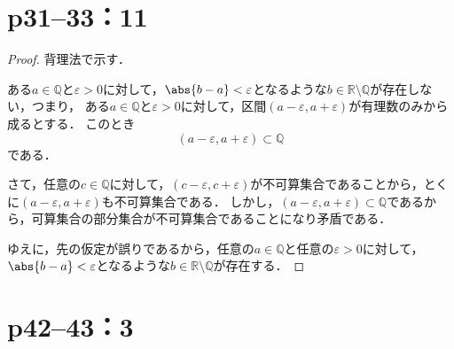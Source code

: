 \documentclass[a4paper,10pt,fleqn]{ltjsarticle}
\begin{document}
\section*{p31--33：11}


\begin{leftbar}
    \begin{proof}
        背理法で示す．

        ある$ a\in \mathbb{Q}$と$\varepsilon >0$に対して，$\abs{b-a}<\varepsilon$となるような$b \in \mathbb{R} \setminus \mathbb{Q}$が存在しない，つまり，
        ある$a \in \mathbb{Q}$と$\varepsilon >0$に対して，区間$(a-\varepsilon , a+ \varepsilon)$が有理数のみから成るとする．
        このとき
        \[
            (a-\varepsilon , a+ \varepsilon) \subset \mathbb{Q}
        \]
        である．

        さて，任意の$ c \in \mathbb{Q}$に対して，$ (c-\varepsilon , c+ \varepsilon)$が不可算集合であることから，とくに$(a-\varepsilon , a+ \varepsilon)$も不可算集合である．
        しかし，$(a-\varepsilon , a+ \varepsilon) \subset \mathbb{Q}$であるから，可算集合の部分集合が不可算集合であることになり矛盾である．

        ゆえに，先の仮定が誤りであるから，任意の$ a\in \mathbb{Q}$と任意の$\varepsilon >0$に対して，$\abs{b-a}<\varepsilon$となるような$b \in \mathbb{R} \setminus \mathbb{Q}$が存在する．
    \end{proof}
\end{leftbar}

\newpage
\section*{p42--43：3}
\end{document}
